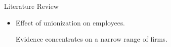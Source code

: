 \begin{frame}{Literature Review}
\begin{itemize}
    \item Effect of unionization on employees.
    
Evidence concentrates on a narrow range of firms.
\end{itemize}

\end{frame}
